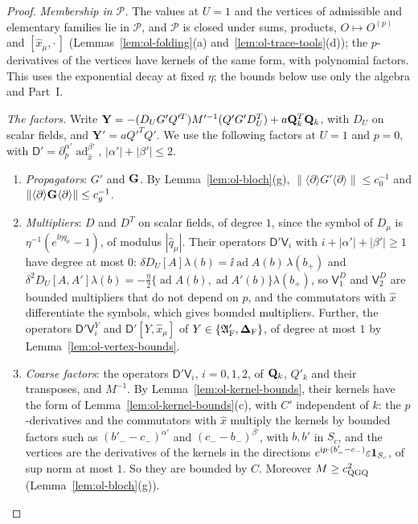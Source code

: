 \begin{proof}
\emph{Membership in $\mathscr P$.} The values at $U=1$ and the vertices of admissible and elementary families lie in $\mathscr P$, and $\mathscr P$ is closed under sums, products, $O\mapsto O^{(p)}$ and $[\hat x_\mu,\cdot\,]$ (Lemmas~\ref{lem:ol-folding}(a) and~\ref{lem:ol-trace-tools}(d)); the $p$-derivatives of the vertices have kernels of the same form, with polynomial factors. This uses the exponential decay at fixed $\eta$; the bounds below use only the algebra and Part~I.

\emph{The factors.} Write $\mathbf Y=-(D_UG'Q'^T)M'^{-1}(Q'G'D_U^T)+a\mathbf Q_k^T\mathbf Q_k$, with $D_U$ on scalar fields, and $\mathbf Y'=aQ'^TQ'$. We use the following factors at $U=1$ and $p=0$, with $\mathsf D'=\partial_p^{\alpha'}\operatorname{ad}_{\hat x}^{\beta'}$, $|\alpha'|+|\beta'|\le2$.
\begin{enumerate}[label=(\roman*)]
\item \emph{Propagators}: $G'$ and $\mathbf G$. By Lemma~\ref{lem:ol-bloch}(g), $\|\langle\partial\rangle G'\langle\partial\rangle\|\le c_0^{-1}$ and $\|\langle\partial\rangle\mathbf G\langle\partial\rangle\|\le c_g^{-1}$.
\item \emph{Multipliers}: $D$ and $D^T$ on scalar fields, of degree $1$, since the symbol of $D_\mu$ is $\eta^{-1}(e^{\ii\eta q_\mu}-1)$, of modulus $|\hat q_\mu|$. Their operators $\mathsf D'\mathsf V_i$ with $i+|\alpha'|+|\beta'|\ge1$ have degree at most $0$: $\delta D_U[A]\lambda(b)=\ii\operatorname{ad}A(b)\,\lambda(b_+)$ and $\delta^2D_U[A,A']\lambda(b)=-\frac\eta2\{\operatorname{ad}A(b),\operatorname{ad}A'(b)\}\lambda(b_+)$, so $\mathsf V_1^D$ and $\mathsf V_2^D$ are bounded multipliers that do not depend on $p$, and the commutators with $\hat x$ differentiate the symbols, which gives bounded multipliers. Further, the operators $\mathsf D'\mathsf V_i^Y$ and $\mathsf D'[Y,\hat x_\mu]$ of $Y\in\{\mathfrak A'_{\rm F},\boldsymbol{\Delta}_{\rm F}\}$, of degree at most $1$ by Lemma~\ref{lem:ol-vertex-bounds}.
\item \emph{Coarse factors}: the operators $\mathsf D'\mathsf V_i$, $i=0,1,2$, of $\mathbf Q_k$, $Q'_k$ and their transposes, and $M^{-1}$. By Lemma~\ref{lem:ol-kernel-bounds}, their kernels have the form of Lemma~\ref{lem:ol-kernel-bounds}(c), with $C'$ independent of $k$: the $p$-derivatives and the commutators with $\hat x$ multiply the kernels by bounded factors such as $(b'_--c_-)^{\alpha'}$ and $(c_--b_-)^{\beta'}$, with $b,b'$ in $S_c$, and the vertices are the derivatives of the kernels in the directions $e^{\mathrm i p\cdot(b'_--c_-)}\varepsilon\mathbf 1_{S_c}$, of sup norm at most $1$. So they are bounded by $C$. Moreover $M\ge c_{\rm QGQ}^2$ (Lemma~\ref{lem:ol-bloch}(g)).
\end{enumerate}


\end{proof}
